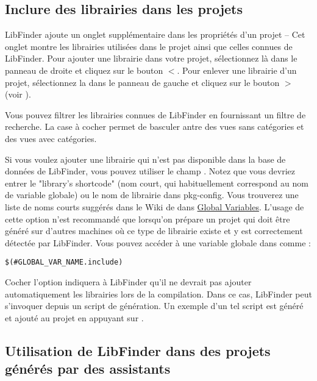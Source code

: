 \subsection{Inclure des librairies dans les projets}

LibFinder ajoute un onglet supplémentaire dans les propriétés d'un projet  -- Cet onglet montre les librairies utilisées dans le projet ainsi que celles connues de LibFinder. Pour ajouter une librairie dans votre projet, sélectionnez là dans le panneau de droite et cliquez sur le bouton $<$. Pour enlever une librairie d'un projet, sélectionnez la dans le panneau de gauche et cliquez sur le bouton $>$ (voir ).


Vous pouvez filtrer les librairies connues de LibFinder en fournissant un filtre de recherche. La case à cocher   permet de basculer antre des vues sans catégories et des vues avec catégories.

Si vous voulez ajouter une librairie qui n'est pas disponible dans la base de données de LibFinder, vous pouvez utiliser le champ . Notez que vous devriez entrer le "library's shortcode" (nom court, qui habituellement correspond au nom de variable globale) ou le nom de librairie dans pkg-config. Vous trouverez une liste de noms courts suggérés dans le Wiki de \codeblocks dans \href{https://wiki.codeblocks.org/index.php?title=Recommended_global_variables}{Global Variables}. L'usage de cette option n'est recommandé que lorsqu'on prépare un projet qui doit être généré sur d'autres machines où ce type de librairie existe et y est correctement détectée par LibFinder. Vous pouvez accéder à une variable globale dans \codeblocks comme :

\begin{lstlisting}
$(#GLOBAL_VAR_NAME.include)
\end{lstlisting}

Cocher l'option  indiquera à LibFinder qu'il ne devrait pas ajouter automatiquement les librairies lors de la compilation. Dans ce cas, LibFinder peut s'invoquer depuis un script de génération. Un exemple d'un tel script est généré et ajouté au projet en appuyant sur  .

\subsection{Utilisation de LibFinder dans des projets générés par des assistants}

